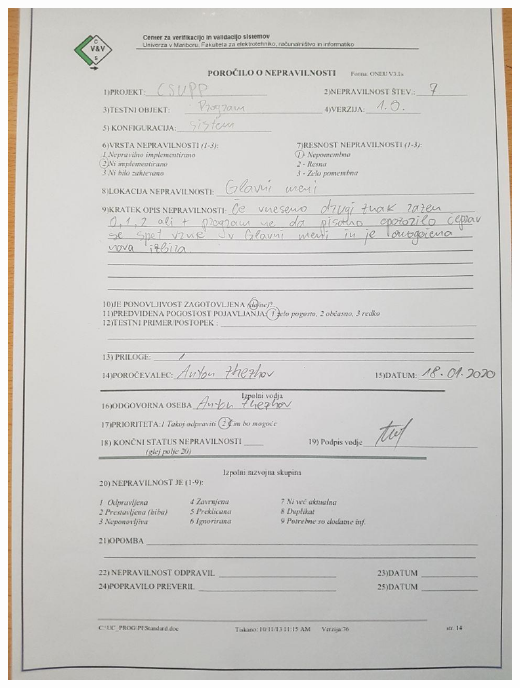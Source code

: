 \documentclass[a4paper,12pt]{article}
\begin{document}
{	\includegraphics[width=15cm]{porocila/07.jpg}
	
\newpage
	
	\hspace{2cm}

	\vspace{2cm}
	
}
\end{document}
